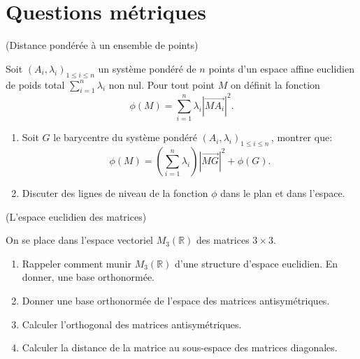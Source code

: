 \documentclass[a4paper,12pt,reqno]{amsart}
\begin{document}

\section{Questions métriques}


\begin{exo} (Distance pondérée à un ensemble de points)

  Soit $(A_i,\lambda_i)_{1\leq i\leq n}$ un système pondéré de $n$ points d'un espace affine euclidien de poids total $\sum_{i=1}^n \lambda_i$ non nul. Pour tout point $M$ on définit la fonction
    $$
      \phi(M)=\sum_{i=1}^n \lambda_i |\overrightarrow{MA_i}|^2.
    $$
  \begin{enumerate}
    \item Soit $G$ le barycentre du système pondéré $(A_i,\lambda_i)_{1\leq i\leq n}$\,, montrer que:
      $$
        \phi(M)=(\sum_{i=1}^n\lambda_i) |\overrightarrow{MG}|^2+\phi(G).
      $$
    \item Discuter des lignes de niveau de la fonction $\phi$ dans le plan et dans l'espace.
  \end{enumerate}
\end{exo}


\begin{exo} (L'espace euclidien des matrices)

  On se place dans l'espace vectoriel $M_3(\mathbb{R})$ des matrices $3\times 3$.
  \begin{enumerate}
    \item Rappeler comment munir $M_3(\mathbb{R})$ d'une structure d'espace euclidien. En donner, une base orthonormée.
    \item Donner une base orthonormée de l'espace des matrices antisymétriques.
    \item Calculer l'orthogonal des matrices antisymétriques.
    \item Calculer la distance de la matrice%
      \scalebox{.7}{
        $
          \begin{pmatrix}
            1 & 0 & 0 \\
            1 & 0 & 1 \\
            0 & 0 & 1
          \end{pmatrix}
        $
      }
    au sous-espace des matrices diagonales.
  \end{enumerate}
\end{exo}
\end{document}
